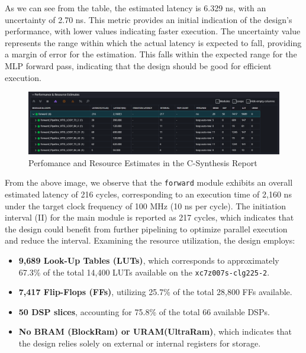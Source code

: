 \documentclass{article}
\begin{document}
As we can see from the table, the estimated latency is 6.329 ns, with an uncertainty of 2.70 ns. This metric provides an initial indication of the design's performance, with lower values indicating faster execution. The uncertainty value represents the range within which the actual latency is expected to fall, providing a margin of error for the estimation. This falls within the expected range for the MLP forward pass, indicating that the design should be good for efficient execution.

\begin{figure}[H]
    \centering
    \includegraphics[width=1\textwidth]{./assets/MLP/c-synthesis-performanceandresourceestimaes.png}
    \caption{Perfomance and Resource Estimates in the C-Synthesis Report}
    \label{fig:convnet-c-synthesis-performance-resources-mlp}
\end{figure}


From the above image, we observe that the \texttt{forward} module exhibits an overall estimated latency of 216 cycles, corresponding to an execution time of 2,160 ns under the target clock frequency of 100 MHz (10 ns per cycle). The initiation interval (II) for the main module is reported as 217 cycles, which indicates that the design could benefit from further pipelining to optimize parallel execution and reduce the interval. Examining the resource utilization, the design employs:
\begin{itemize}
    \item \textbf{9,689 Look-Up Tables (LUTs)}, which corresponds to approximately 67.3\% of the total 14,400 LUTs available on the \texttt{xc7z007s-clg225-2}.
    \item \textbf{7,417 Flip-Flops (FFs)}, utilizing 25.7\% of the total 28,800 FFs available.
    \item \textbf{50 DSP slices}, accounting for 75.8\% of the total 66 available DSPs.
    \item \textbf{No BRAM (BlockRam) or URAM(UltraRam)}, which indicates that the design relies solely on external or internal registers for storage.
\end{itemize}
\end{document}
